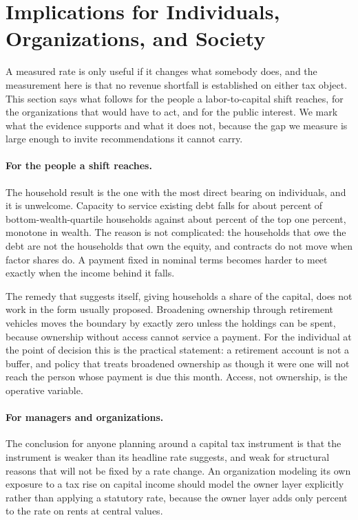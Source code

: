 \section{Implications for Individuals, Organizations, and Society}
\label{sec:implications}

A measured rate is only useful if it changes what somebody does, and the measurement here is
that no revenue shortfall is established on either tax object. This section says what
follows for the people a labor-to-capital shift reaches, for the organizations that would have
to act, and for the public interest. We mark what the evidence supports and what it does not,
because the gap we measure is large enough to invite recommendations it cannot carry.

\paragraph{For the people a shift reaches.} The household result is the one with the most direct
bearing on individuals, and it is unwelcome. Capacity to service existing debt falls for about
 percent of bottom-wealth-quartile households against about
 percent of the top one percent, monotone in wealth. The reason is
not complicated: the households that owe the debt are not the households that own the equity, and
contracts do not move when factor shares do. A payment fixed in nominal terms becomes harder to
meet exactly when the income behind it falls.

The remedy that suggests itself, giving households a share of the capital, does not work in the
form usually proposed. Broadening ownership through retirement vehicles moves the boundary by
exactly zero unless the holdings can be spent, because ownership without access cannot service a
payment. For the individual at the point of decision this is the practical statement: a
retirement account is not a buffer, and policy that treats broadened ownership as though it were
one will not reach the person whose payment is due this month. Access, not ownership, is the
operative variable.

\paragraph{For managers and organizations.} The conclusion for anyone planning around a capital
tax instrument is that the instrument is weaker than its headline rate suggests, and weak for
structural reasons that will not be fixed by a rate change. An organization modeling its own
exposure to a tax rise on capital income should model the owner layer explicitly rather than
applying a statutory rate, because the owner layer adds only  percent
to the rate on rents at central values.

